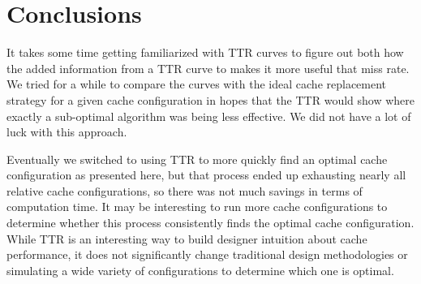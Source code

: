\section{Conclusions}

It takes some time getting familiarized with TTR curves to figure out both how the added information from a TTR curve to makes it more useful that miss rate. 
We tried for a while to compare the curves with the ideal cache replacement strategy for a given cache configuration in hopes that the TTR would show where exactly a sub-optimal algorithm was being less effective. 
We did not have a lot of luck with this approach.

Eventually we switched to using TTR to more quickly find an optimal cache configuration as presented here, but that process ended up exhausting nearly all relative cache configurations, so there was not much savings in terms of computation time. It may be interesting to run more cache configurations to determine whether this process consistently finds the optimal cache configuration. While TTR is an interesting way to build designer intuition about cache performance, it does not significantly change traditional design methodologies or simulating a wide variety of configurations to determine which one is optimal.